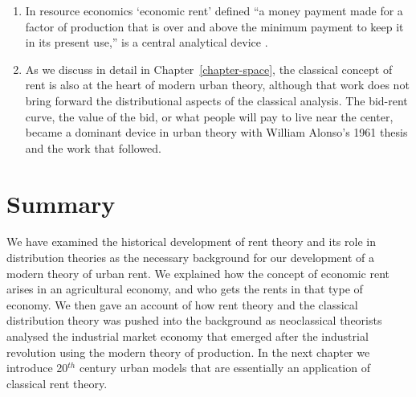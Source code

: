 \begin{enumerate}
\item In resource economics `economic rent' defined ``a money payment made for a factor of production that is over and above the minimum payment to keep it in its present use,'' is a central analytical device \cite{Gray1914RentUT}.   
    
\item As we discuss in detail in Chapter~\ref{chapter-space}, the classical concept of rent is also at the heart of modern urban theory, although that work does not bring forward the distributional aspects of the classical analysis. The \gls{bid-rent curve}, the value of the bid, or what people will pay to live near the center, became a dominant device in urban theory with William Alonso's 1961 thesis \cite{alonsoTheoryUrbanLand1960} and the work that followed. %
\end{enumerate}

 
\section{Summary}



We have examined the historical development  of rent theory and its role in distribution theories as the necessary background for our development of a modern theory of urban rent. We explained how the concept of economic rent arises in an agricultural economy, and who gets the rents in that type of economy. We then gave an account of how rent theory and the classical distribution theory was pushed into the background as neoclassical theorists analysed the industrial market economy that emerged after the industrial revolution using the  modern theory of production. In the next chapter we introduce 20$^{th}$ century urban models that are essentially an application of classical rent theory.


